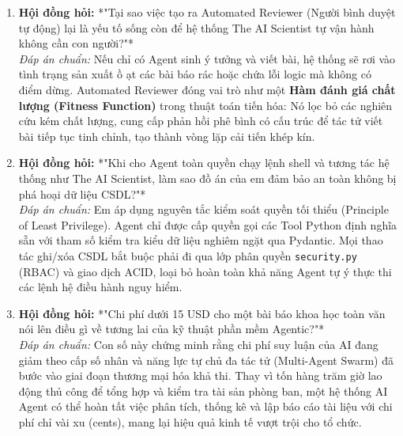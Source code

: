 \documentclass[11pt,a4paper]{article}
\begin{document}
\begin{deepdivebox}
\begin{enumerate}[leftmargin=1.5em]
    \item \textbf{Hội đồng hỏi:} *"Tại sao việc tạo ra Automated Reviewer (Người bình duyệt tự động) lại là yếu tố sống còn để hệ thống The AI Scientist tự vận hành không cần con người?"*\\
    \textit{Đáp án chuẩn:} Nếu chỉ có Agent sinh ý tưởng và viết bài, hệ thống sẽ rơi vào tình trạng sản xuất ồ ạt các bài báo rác hoặc chứa lỗi logic mà không có điểm dừng. Automated Reviewer đóng vai trò như một \textbf{Hàm đánh giá chất lượng (Fitness Function)} trong thuật toán tiến hóa: Nó lọc bỏ các nghiên cứu kém chất lượng, cung cấp phản hồi phê bình có cấu trúc để tác tử viết bài tiếp tục tinh chỉnh, tạo thành vòng lặp cải tiến khép kín.
    
    \item \textbf{Hội đồng hỏi:} *"Khi cho Agent toàn quyền chạy lệnh shell và tương tác hệ thống như The AI Scientist, làm sao đồ án của em đảm bảo an toàn không bị phá hoại dữ liệu CSDL?"*\\
    \textit{Đáp án chuẩn:} Em áp dụng nguyên tắc kiểm soát quyền tối thiểu (Principle of Least Privilege). Agent chỉ được cấp quyền gọi các Tool Python định nghĩa sẵn với tham số kiểm tra kiểu dữ liệu nghiêm ngặt qua Pydantic. Mọi thao tác ghi/xóa CSDL bắt buộc phải đi qua lớp phân quyền \texttt{security.py} (RBAC) và giao dịch ACID, loại bỏ hoàn toàn khả năng Agent tự ý thực thi các lệnh hệ điều hành nguy hiểm.

    \item \textbf{Hội đồng hỏi:} *"Chi phí dưới 15 USD cho một bài báo khoa học toàn văn nói lên điều gì về tương lai của kỹ thuật phần mềm Agentic?"*\\
    \textit{Đáp án chuẩn:} Con số này chứng minh rằng chi phí suy luận của AI đang giảm theo cấp số nhân và năng lực tự chủ đa tác tử (Multi-Agent Swarm) đã bước vào giai đoạn thương mại hóa khả thi. Thay vì tốn hàng trăm giờ lao động thủ công để tổng hợp và kiểm tra tài sản phòng ban, một hệ thống AI Agent có thể hoàn tất việc phân tích, thống kê và lập báo cáo tài liệu với chi phí chỉ vài xu (cents), mang lại hiệu quả kinh tế vượt trội cho tổ chức.
\end{enumerate}
\end{deepdivebox}
\end{document}
